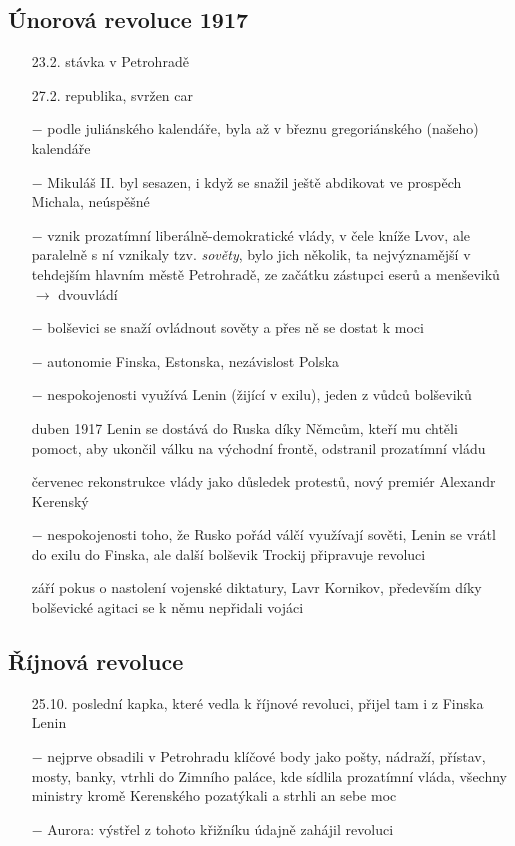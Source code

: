 \documentclass{article}
\begin{document}
\subsection*{Únorová revoluce 1917}
\begin{itemize}
    \vspace{-0.5em}
    \setlength\itemsep{0.15em}
    \item[23.2.] stávka v Petrohradě
    \item[27.2.] republika, svržen car
    \item[$-$] podle juliánského kalendáře, byla až v březnu gregoriánského (našeho) kalendáře
    \item[$-$] Mikuláš II. byl sesazen, i když se snažil ještě abdikovat ve prospěch Michala, neúspěšné
    \item[$-$] vznik prozatímní liberálně-demokratické vlády, v čele kníže Lvov, ale paralelně s ní vznikaly tzv. \textit{sověty}, bylo jich několik, ta nejvýznamější v tehdejším hlavním městě Petrohradě, ze začátku zástupci eserů a menševiků $\rightarrow$ dvouvládí
    \item[$-$] bolševici se snaží ovládnout sověty a přes ně se dostat k moci
    \item[$-$] autonomie Finska, Estonska, nezávislost Polska
    \item[$-$] nespokojenosti využívá Lenin (žijící v exilu), jeden z vůdců bolševiků
    \item[duben 1917] Lenin se dostává do Ruska díky Němcům, kteří mu chtěli pomoct, aby ukončil válku na východní frontě, odstranil prozatímní vládu
    \item[červenec] rekonstrukce vlády jako důsledek protestů, nový premiér Alexandr Kerenský
    \item[$-$] nespokojenosti toho, že Rusko pořád válčí využívají sověti, Lenin se vrátl do exilu do Finska, ale další bolševik Trockij připravuje revoluci
    \item[září] pokus o nastolení vojenské diktatury, Lavr Kornikov, především díky bolševické agitaci se k němu nepřidali vojáci
\end{itemize}

\subsection*{Říjnová revoluce}
\begin{itemize}
    \vspace{-0.5em}
    \setlength\itemsep{0.15em}
    \item[25.10.] poslední kapka, které vedla k říjnové revoluci, přijel tam i z Finska Lenin
    \item[$-$] nejprve obsadili v Petrohradu klíčové body jako pošty, nádraží, přístav, mosty, banky, vtrhli do Zimního paláce, kde sídlila prozatímní vláda, všechny ministry kromě Kerenského pozatýkali a strhli an sebe moc
    \item[$-$] Aurora: výstřel z tohoto křižníku údajně zahájil revoluci
\end{itemize}
\end{document}
